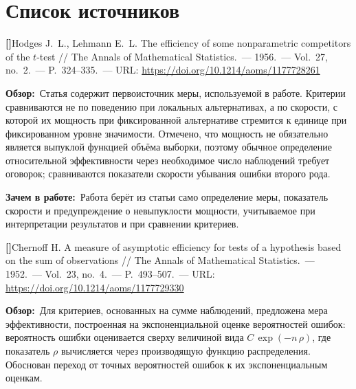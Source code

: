 
\providecommand{\doi}[1]{DOI: \texttt{#1}}

\renewcommand{\thesrc}{\arabic{src}}
\newcommand{\source}[1]{\stepcounter{src}%
  \par\vspace{0.8em}\noindent\textbf{[\thesrc]}\enspace #1\par\nopagebreak}
\newcommand{\review}{\par\noindent\textbf{Обзор:}\ }
\newcommand{\why}{\par\noindent\textbf{Зачем в работе:}\ }

\section{Список источников}
\label{sec:materials}

\source{Hodges J.~L., Lehmann E.~L. The efficiency of some nonparametric competitors of
the $t$-test // The Annals of Mathematical Statistics.~--- 1956.~--- Vol.~27, no.~2.~---
P.~324--335.~--- URL: \url{https://doi.org/10.1214/aoms/1177728261}}

\review Статья содержит первоисточник меры, используемой в работе. Критерии сравниваются
не по поведению при локальных альтернативах, а по скорости, с которой их мощность при
фиксированной альтернативе стремится к единице при фиксированном уровне значимости.
Отмечено, что мощность не обязательно является выпуклой функцией объёма выборки, поэтому
обычное определение относительной эффективности через необходимое число наблюдений требует
оговорок; сравниваются показатели скорости убывания ошибки второго рода.

\why Работа берёт из статьи само определение меры, показатель скорости и предупреждение о
невыпуклости мощности, учитываемое при интерпретации результатов и при сравнении критериев.

\source{Chernoff H. A measure of asymptotic efficiency for tests of a hypothesis based on
the sum of observations // The Annals of Mathematical Statistics.~--- 1952.~--- Vol.~23,
no.~4.~--- P.~493--507.~--- URL: \url{https://doi.org/10.1214/aoms/1177729330}}

\review Для критериев, основанных на сумме наблюдений, предложена мера эффективности,
построенная на экспоненциальной оценке вероятностей ошибок: вероятность ошибки оценивается
сверху величиной вида $C\,\exp(-n\,\rho)$, где показатель $\rho$ вычисляется через
производящую функцию распределения. Обоснован переход от точных вероятностей ошибок к их экспоненциальным
оценкам.

